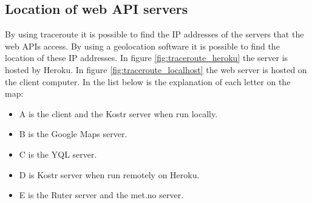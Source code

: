 \documentclass[10pt,a4paper]{article}
\begin{document}
\subsection{Location of web API servers}
By using traceroute it is possible to find the IP addresses of the servers that the web APIs access. By using a geolocation software it is possible to find the location of these IP addresses. In figure \ref{fig:traceroute_heroku} the server is hosted by Heroku. In figure \ref{fig:traceroute_localhost} the web server is hosted on the client computer. In the list below is the explanation of each letter on the map:
\begin{itemize}
\item A is the client and the Kostr server when run locally.
\item B is the Google Maps server.
\item C is the YQL server.
\item D is Kostr server when run remotely on Heroku.
\item E is the Ruter server and the met.no server.
\end{itemize}
\end{document}
